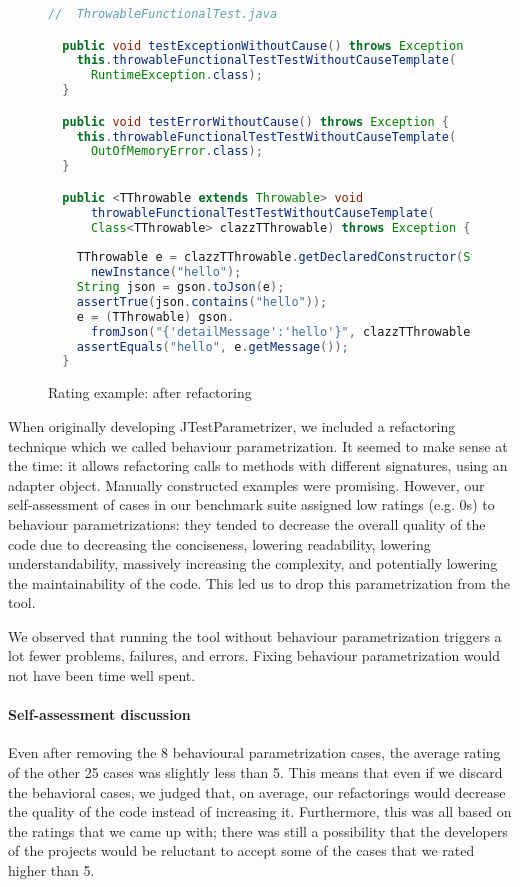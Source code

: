 \begin{figure}
\begin{lstlisting}[language=Java]
  //  ThrowableFunctionalTest.java

  public void testExceptionWithoutCause() throws Exception {
    this.throwableFunctionalTestTestWithoutCauseTemplate(
      RuntimeException.class);
  }

  public void testErrorWithoutCause() throws Exception {
    this.throwableFunctionalTestTestWithoutCauseTemplate(
      OutOfMemoryError.class);
  }

  public <TThrowable extends Throwable> void
      throwableFunctionalTestTestWithoutCauseTemplate(
      Class<TThrowable> clazzTThrowable) throws Exception {
      
    TThrowable e = clazzTThrowable.getDeclaredConstructor(String.class).
      newInstance("hello");
    String json = gson.toJson(e);
    assertTrue(json.contains("hello"));
    e = (TThrowable) gson.
      fromJson("{'detailMessage':'hello'}", clazzTThrowable);
    assertEquals("hello", e.getMessage());
  }
\end{lstlisting}
\caption{Rating example: after refactoring}
\label{figure:rating-after}
\end{figure}

When originally developing JTestParametrizer, we included a refactoring technique which we called behaviour parametrization. It seemed to make sense at the time: it allows refactoring calls to methods with different signatures, using an adapter object. Manually constructed examples were promising. However, our self-assessment of cases in our benchmark suite assigned low ratings (e.g. 0s) to behaviour parametrizations: they tended to decrease the overall quality of the code due to decreasing the conciseness, lowering readability, lowering understandability, massively increasing the complexity, and potentially lowering the maintainability of the code. This led us to drop this parametrization from the tool.

We observed that running the tool without behaviour parametrization triggers a lot fewer problems, failures, and errors. Fixing behaviour parametrization would not have been time well spent.


\paragraph{Self-assessment discussion}
Even after removing the 8 behavioural parametrization  cases, the average rating of the other 25 cases was slightly less than 5. This means that even if we discard the behavioral cases, we judged that, on average, our refactorings would decrease the quality of the code instead of increasing it. Furthermore, this was all based on the ratings that we came up with; there was still a possibility that the developers of the projects would be reluctant to accept some of the cases that we rated higher than 5.

